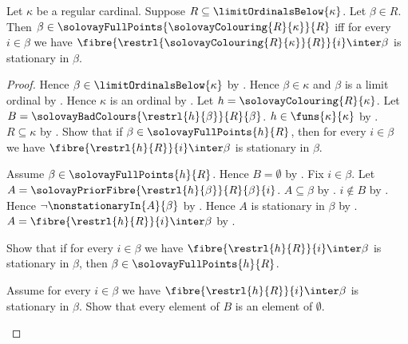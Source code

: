 \begin{theorem}\label{solovay_full_point_iff_local_stationary}
    Let $\kappa$ be a regular cardinal.
    Suppose $R\subseteq\limitOrdinalsBelow{\kappa}$.
    Let $\beta\in R$.
    Then $\beta\in\solovayFullPoints{\solovayColouring{R}{\kappa}}{R}$
        iff for every $i\in\beta$ we have
            $\fibre{\restrl{\solovayColouring{R}{\kappa}}{R}}{i}
                \inter\beta$ is stationary in $\beta$.
\end{theorem}
\begin{proof}
    Hence $\beta\in\limitOrdinalsBelow{\kappa}$ by .
    Hence $\beta\in\kappa$ and $\beta$ is a limit ordinal
        by .
    Hence $\kappa$ is an ordinal by
        .
    Let $h=\solovayColouring{R}{\kappa}$.
    Let $B=\solovayBadColours{\restrl{h}{\beta}}{R}{\beta}$.
    $h\in\funs{\kappa}{\kappa}$ by .
    $R\subseteq\kappa$ by
        .
    Show that if $\beta\in\solovayFullPoints{h}{R}$, then
        for every $i\in\beta$ we have
            $\fibre{\restrl{h}{R}}{i}\inter\beta$ is stationary in $\beta$.
    \begin{subproof}
        Assume $\beta\in\solovayFullPoints{h}{R}$.
        Hence $B=\emptyset$
            by .
        Fix $i\in\beta$.
        Let $A=\solovayPriorFibre{\restrl{h}{\beta}}{R}{\beta}{i}$.
        $A\subseteq\beta$ by .
        $i\notin B$ by \auto.
        Hence $\lnot\nonstationaryIn{A}{\beta}$
            by .
        Hence $A$ is stationary in $\beta$
            by .
        $A=\fibre{\restrl{h}{R}}{i}\inter\beta$
            by .
    \end{subproof}
    Show that if for every $i\in\beta$ we have
        $\fibre{\restrl{h}{R}}{i}\inter\beta$ is stationary in $\beta$,
        then $\beta\in\solovayFullPoints{h}{R}$.
    \begin{subproof}
        Assume for every $i\in\beta$ we have
            $\fibre{\restrl{h}{R}}{i}\inter\beta$ is stationary in $\beta$.
        Show that every element of $B$ is an element of $\emptyset$.
\end{subproof}
\end{proof}
